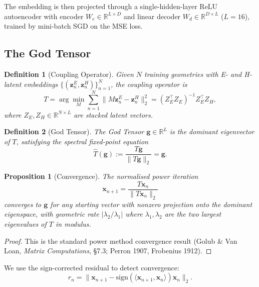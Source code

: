 \documentclass[11pt,twocolumn]{article}
\newtheorem{definition}{Definition}
\newtheorem{proposition}{Proposition}
\begin{document}
The embedding is then projected through a single-hidden-layer ReLU
autoencoder with encoder $W_e \in \mathbb{R}^{L \times D}$ and linear
decoder $W_d \in \mathbb{R}^{D \times L}$ ($L = 16$), trained by
mini-batch SGD on the MSE loss.

\subsection{The God Tensor}

\begin{definition}[Coupling Operator]
Given $N$ training geometries with E- and H-latent embeddings
$\{(\mathbf{z}_n^E, \mathbf{z}_n^H)\}_{n=1}^N$, the coupling operator is
\begin{equation}
T = \arg\min_{M} \sum_{n=1}^N \|M\mathbf{z}_n^E - \mathbf{z}_n^H\|_2^2
  = (Z_E^\top Z_E)^{-1} Z_E^\top Z_H,
\label{eq:T}
\end{equation}
where $Z_E, Z_H \in \mathbb{R}^{N \times L}$ are stacked latent vectors.
\end{definition}

\begin{definition}[God Tensor]
The \emph{God Tensor} $\mathbf{g} \in \mathbb{R}^L$ is the dominant
eigenvector of $T$, satisfying the spectral fixed-point equation
\begin{equation}
\hat{T}(\mathbf{g}) := \frac{T\mathbf{g}}{\|T\mathbf{g}\|_2} = \mathbf{g}.
\label{eq:god_tensor}
\end{equation}
\end{definition}

\begin{proposition}[Convergence]
The normalised power iteration
\[
\mathbf{x}_{n+1} = \frac{T\mathbf{x}_n}{\|T\mathbf{x}_n\|_2}
\]
converges to $\mathbf{g}$ for any starting vector with nonzero projection
onto the dominant eigenspace, with geometric rate
$|\lambda_2/\lambda_1|$ where $\lambda_1, \lambda_2$ are the two largest
eigenvalues of $T$ in modulus.
\end{proposition}

\begin{proof}
This is the standard power method convergence result (Golub \& Van Loan,
\emph{Matrix Computations}, \S7.3; Perron 1907, Frobenius 1912).
\end{proof}

We use the sign-corrected residual to detect convergence:
\begin{equation}
r_n = \|\mathbf{x}_{n+1} -
      \mathrm{sign}(\langle \mathbf{x}_{n+1}, \mathbf{x}_n \rangle)
      \mathbf{x}_n\|_2.
\label{eq:residual}
\end{equation}
\end{document}
